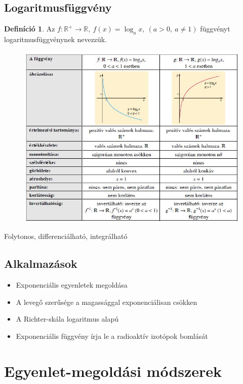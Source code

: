 \documentclass[twoside,12pt]{report}
\theoremstyle{definition}
\newtheorem{definition}[theorem]{Definíció}
\begin{document}
\section{Logaritmusfüggvény}
	\begin{definition}
		Az $f:\mathbb{R}^+\longrightarrow\mathbb{R},\ f(x)=\log_ax,\ (a>0,\ a\ne1)$ függvényt logaritmusfüggvénynek nevezzük.
	\end{definition}
	\begin{figure}[H]
		\centering
		\includegraphics[width=\linewidth]{LogFv.JPG}
	\end{figure}
	Folytonos, differenciálható, integrálható
\section{Alkalmazások}
	\begin{itemize}
		\item Exponenciális egyenletek megoldása
		\item A levegő szerűsége a magassággal exponenciálisan csökken
		\item A Richter-skála logaritmus alapú
		\item Exponenciális függvény írja le a radioaktív izotópok bomlását
	\end{itemize}
\chapter{Egyenlet-megoldási módszerek}
\end{document}
